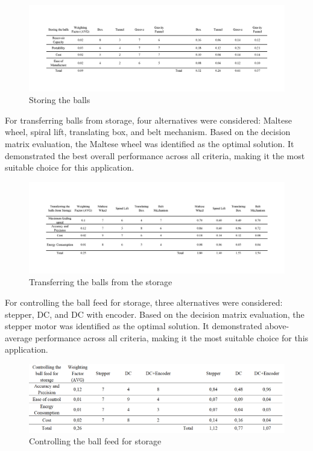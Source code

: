 \documentclass[12pt]{article}
\begin{document}
\begin{figure}[H]
    \centering
    \includegraphics[width=1\textwidth]{Decision matrices/storing.png}
    \caption{Storing the balls}
\end{figure}
For transferring balls from storage, four alternatives were considered: Maltese wheel, spiral lift, translating box, and belt mechanism. Based on the decision matrix evaluation, the Maltese wheel was identified as the optimal solution. It demonstrated the best overall performance across all criteria, making it the most suitable choice for this application.

\begin{figure}[H]
    \centering
    \includegraphics[width=1\textwidth]{Decision matrices/transfer from storage.png}
    \caption{Transferring the balls from  the storage} 
\end{figure}

For controlling the ball feed for storage, three alternatives were considered: stepper, DC, and DC with encoder. Based on the decision matrix evaluation, the stepper motor was identified as the optimal solution. It demonstrated above-average performance across all criteria, making it the most suitable choice for this application.

\begin{figure}[H]
    \centering
    \includegraphics[width=1\textwidth]{Decision matrices/controlling ball feed for storage.png}
    \caption{Controlling the ball feed for storage}
\end{figure}
\end{document}
